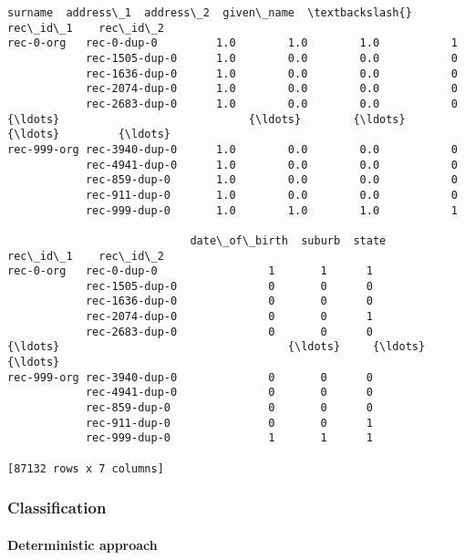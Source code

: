 \documentclass{article}
\begin{document}
    \begin{Verbatim}[commandchars=\\\{\}]

\end{Verbatim}
\begin{Verbatim}[commandchars=\\\{\}]
                            surname  address\_1  address\_2  given\_name  \textbackslash{}
rec\_id\_1    rec\_id\_2                                                    
rec-0-org   rec-0-dup-0         1.0        1.0        1.0           1   
            rec-1505-dup-0      1.0        0.0        0.0           0   
            rec-1636-dup-0      1.0        0.0        0.0           0   
            rec-2074-dup-0      1.0        0.0        0.0           0   
            rec-2683-dup-0      1.0        0.0        0.0           0   
{\ldots}                             {\ldots}        {\ldots}        {\ldots}         {\ldots}   
rec-999-org rec-3940-dup-0      1.0        0.0        0.0           0   
            rec-4941-dup-0      1.0        0.0        0.0           0   
            rec-859-dup-0       1.0        0.0        0.0           0   
            rec-911-dup-0       1.0        0.0        0.0           0   
            rec-999-dup-0       1.0        1.0        1.0           1   

                            date\_of\_birth  suburb  state  
rec\_id\_1    rec\_id\_2                                      
rec-0-org   rec-0-dup-0                 1       1      1  
            rec-1505-dup-0              0       0      0  
            rec-1636-dup-0              0       0      0  
            rec-2074-dup-0              0       0      1  
            rec-2683-dup-0              0       0      0  
{\ldots}                                   {\ldots}     {\ldots}    {\ldots}  
rec-999-org rec-3940-dup-0              0       0      0  
            rec-4941-dup-0              0       0      0  
            rec-859-dup-0               0       0      0  
            rec-911-dup-0               0       0      1  
            rec-999-dup-0               1       1      1  

[87132 rows x 7 columns]
\end{Verbatim}
    \hypertarget{classification}{%
\subsubsection{Classification}\label{classification}}

\hypertarget{deterministic-approach}{%
\paragraph{Deterministic approach}\label{deterministic-approach}}
\end{document}
